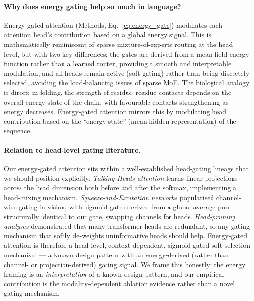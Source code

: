 \documentclass[fleqn,10pt]{article}
\begin{document}
\paragraph{Why does energy gating help so much in language?}
Energy-gated attention (Methods, Eq.~\ref{eq:energy_gate}) modulates
each attention head's contribution based on a global energy signal.
This is mathematically reminiscent of sparse mixture-of-experts
routing at the head level,\cite{shazeer2017outrageously,fedus2022switch}
but with two key differences: the gates are derived from a
mean-field energy function rather than a learned router, providing a
smooth and interpretable modulation, and all heads remain active
(soft gating) rather than being discretely selected, avoiding the
load-balancing issues of sparse MoE. The biological analogy is direct:
in folding, the strength of residue--residue contacts depends on the
overall energy state of the chain, with favourable contacts
strengthening as energy decreases.\cite{dill2012protein} Energy-gated
attention mirrors this by modulating head contribution based on the
``energy state'' (mean hidden representation) of the sequence.

\paragraph{Relation to head-level gating literature.}
Our energy-gated attention sits within a well-established head-gating
lineage that we should position explicitly. \emph{Talking-Heads
attention}\cite{shazeer2020talkingheads} learns linear projections
across the head dimension both before and after the softmax,
implementing a head-mixing mechanism. \emph{Squeeze-and-Excitation
networks}\cite{hu2018squeeze} popularised channel-wise gating in
vision, with sigmoid gates derived from a global average pool ---
structurally identical to our gate, swapping channels for heads.
\emph{Head-pruning analyses}\cite{voita2019analyzing,michel2019sixteen}
demonstrated that many transformer heads are redundant, so any
gating mechanism that softly de-weights uninformative heads should
help. Energy-gated attention is therefore a head-level,
context-dependent, sigmoid-gated soft-selection mechanism --- a known
design pattern with an energy-derived (rather than channel- or
projection-derived) gating signal. We frame this honestly: the
energy framing is an \emph{interpretation} of a known design
pattern, and our empirical contribution is the modality-dependent
ablation evidence rather than a novel gating mechanism.
\end{document}
